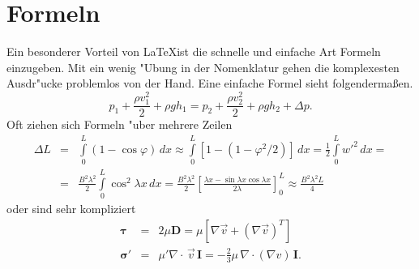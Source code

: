 \chapter[Formatierungen]{Formeln}\label{cha-formeln}

Ein besonderer Vorteil von \LaTeX ist die schnelle und einfache Art Formeln einzugeben. Mit ein wenig "Ubung in der Nomenklatur gehen die komplexesten Ausdr"ucke problemlos von der Hand. Eine einfache Formel sieht folgendermaßen.
\begin{equation}
p_1+\frac{\rho v_1^2}{2}+\rho gh_1=p_2+\frac{\rho v_2^2}{2}+\rho gh_2+\Delta p.
\label{eqn-bernoulli}
\end{equation}
Oft ziehen sich Formeln "uber mehrere Zeilen  
\begin{eqnarray}
\Delta L&=&\int\limits_0^L(1-\cos\varphi)\,dx\approx\int\limits_0^L[1-(1-\varphi^2/2)]\,dx=\frac{1}{2}\int\limits_0^Lw'^2\,dx=\nonumber\\
&=&\frac{B^2\lambda^2}{2}\int\limits_0^L\cos^2\lambda x\,dx=\frac{B^2\lambda^2}{2}\left[\frac{\lambda x-\sin\lambda x\cos\lambda x}{2\lambda}\right]_0^L\approx\frac{B^2\lambda^2L}{4}
\end{eqnarray}
oder sind sehr kompliziert
\begin{eqnarray}
\boldsymbol{\tau}&=&2\mu\mathbf{D}=\mu[\nabla\vec{v}+(\nabla\vec{v})^T]\\
\boldsymbol{\sigma}'&=&\mu'\nabla\cdot\,\vec{v}\,\mathbf{I}=-\frac{2}{3}\mu\,\nabla\cdot(\nabla{v})\,\mathbf{I}.
\end{eqnarray}

